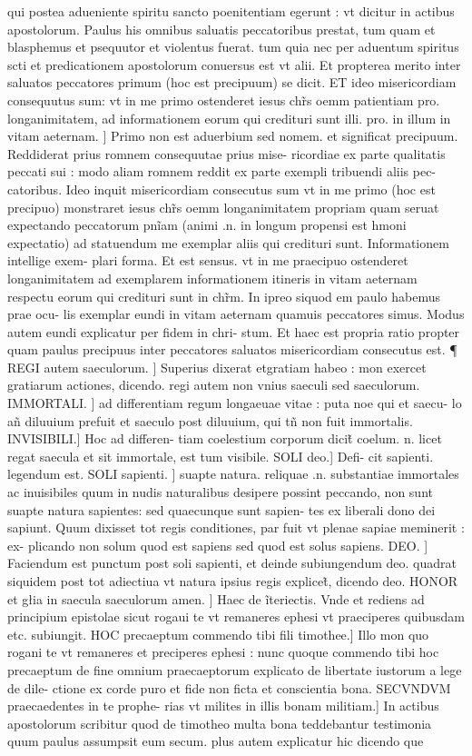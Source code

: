 \documentclass{article}
\begin{document}
\begin{pages}
qui postea adueniente spiritu sancto poenitentiam egerunt : vt dicitur in actibus apostolorum. Paulus his omnibus saluatis peccatoribus prestat, tum quam et blasphemus et psequutor et violentus fuerat. tum quia nec per aduentum spiritus scti et predicationem apostolorum conuersus est vt alii. Et propterea merito inter saluatos peccatores primum (hoc est precipuum) se dicit. ET ideo misericordiam consequutus sum: vt in me primo ostenderet iesus chr̃s oemm patientiam pro. longanimitatem, ad informationem eorum qui credituri sunt illi. pro. in illum  in vitam aeternam. ] Primo non est aduerbium sed nomem. et significat precipuum. Reddiderat prius romnem consequutae prius mise- ricordiae ex parte qualitatis peccati sui : modo aliam romnem reddit ex parte exempli tribuendi aliis pec- catoribus. Ideo inquit misericordiam consecutus sum vt in me primo (hoc est precipuo) monstraret iesus chr̃s oemm longanimitatem propriam quam seruat expectando peccatorum pnĩam (animi .n. in longum propensi est hmoni expectatio) ad statuendum me exemplar aliis qui credituri sunt. Informationem intellige exem- plari forma. Et est sensus. vt in me praecipuo ostenderet longanimitatem ad exemplarem informationem itineris in vitam aeternam respectu eorum qui credituri sunt in chr̃m. In ipreo siquod em paulo habemus prae ocu- lis exemplar eundi in vitam aeternam  quamuis peccatores simus. Modus autem eundi explicatur per fidem in chri- stum. Et haec est propria ratio propter quam paulus precipuus inter peccatores saluatos misericordiam consecutus est. ¶ REGI autem saeculorum. ] Superius dixerat   etgratiam habeo : mon exercet gratiarum actiones, dicendo. regi autem non vnius saeculi sed saeculorum. IMMORTALI. ] ad differentiam regum longaeuae vitae : puta noe qui et saecu- lo añ diluuium prefuit et saeculo post diluuium, qui tñ non fuit immortalis. INVISIBILI.] Hoc ad differen- tiam coelestium corporum dicit̃ coelum. n. licet regat saecula et sit immortale, est tum visibile. SOLI deo.] Defi- cit sapienti. legendum est. SOLI sapienti. ] suapte natura. reliquae .n. substantiae immortales ac inuisibiles quum in nudis naturalibus desipere possint peccando, non sunt suapte natura sapientes: sed quaecunque  sunt sapien- tes  ex liberali dono dei sapiunt. Quum dixisset tot regis conditiones, par fuit vt plenae sapiae meminerit : ex- plicando non solum quod est sapiens  sed quod est solus sapiens. DEO. ] Faciendum est punctum post soli sapienti, et deinde subiungendum deo. quadrat siquidem post tot adiectiua vt natura ipsius regis explicet̃, dicendo deo. HONOR et głia in saecula saeculorum amen. ] Haec de ĩteriectis. Vnde et rediens ad principium epistolae sicut rogaui te vt remaneres ephesi vt praeciperes quibusdam etc.  subiungit. HOC precaeptum commendo tibi fili timothee.] Illo mon quo rogani te vt remaneres et preciperes ephesi : nunc quoque  commendo tibi hoc precaeptum de fine omnium praecaeptorum explicato  de libertate iustorum a lege de dile- ctione ex corde puro et fide non ficta et conscientia bona. SECVNDVM praecaedentes in te prophe- rias vt milites in illis bonam militiam.] In actibus apostolorum scribitur quod de timotheo multa bona  \pend\pstart teddebantur testimonia  quum paulus assumpsit eum secum. plus autem explicatur hic  dicendo que   \pend

\end{pages}
\end{document}
